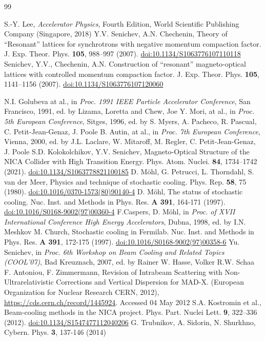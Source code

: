 \documentclass[submitting]{nst}
\begin{document}
	\begin{thebibliography} {99}
		
			S.-Y. Lee, {\it Accelerator Physics}, Fourth Edition, World Scientific Publishing Company (Singapore, 2018)
			Y.V. Senichev, A.N. Chechenin, Theory of “Resonant” lattices for synchrotrons with negative momentum compaction factor. J. Exp. Theor. Phys. {\bf 105}, 988–997 (2007). \href{https://doi.org/10.1134/S1063776107110118}{doi:10.1134/S1063776107110118}
			Senichev, Y.V., Chechenin, A.N. Construction of “resonant” magneto-optical lattices with controlled momentum compaction factor. J. Exp. Theor. Phys. {\bf 105}, 1141–1156 (2007). \href{https://doi.org/10.1134/S1063776107120060}{doi:10.1134/S1063776107120060}
		
		 N.I. Golubeva at al., in {\it Proc. 1991 IEEE Particle Accelerator Conference}, San Francisco, 1991, ed. by Lizama, Loretta and Chew, Joe
			Y. Mori, at al., in {\it Proc. 5th European Conference}, Sitges, 1996, ed. by S. Myers, A. Pacheco, R. Pascual, C. Petit-Jean-Genaz, J. Poole
		 B. Autin, at al., in {\it Proc. 7th European Conference},  Vienna, 2000, ed. by J.L. Laclare, W. Mitaroff, M. Regler, C. Petit-Jean-Genaz, J. Poole
			S.D. Kolokolchikov, Y.V. Senichev, Magneto-Optical Structure of the NICA Collider with High Transition Energy. Phys. Atom. Nuclei. {\bf 84}, 1734–1742 (2021). \href{https://doi.org/10.1134/S1063778821100185}{doi:10.1134/S1063778821100185}
			D. Möhl, G. Petrucci, L. Thorndahl, S. van der Meer, Physics and technique of stochastic cooling. Phys. Rep. {\bf 58}, 75 (1980). \href{https://doi.org/10.1016/0370-1573(80)90140-4}{doi:10.1016/0370-1573(80)90140-4}
			D. Möhl, The status of stochastic cooling. Nuc. Inst. and Methods in Phys. Res. {\bf A 391}, 164-171 (1997). \href{https://doi.org/10.1016/S0168-9002(97)00360-4}{doi:10.1016/S0168-9002(97)00360-4}
			F.Caspers, D. Möhl, in {\it Proc. of XVII International Conference High Energy Accelerators}, Dubna, 1998, ed. by I.N. Meshkov
			M. Church, Stochastic cooling in Fermilab. Nuc. Inst. and Methods in Phys. Res. {\bf A 391}, 172-175 (1997). \href{https://doi.org/10.1016/S0168-9002(97)00358-6}{doi:10.1016/S0168-9002(97)00358-6}
			Yu. Senichev, in {\it Proc. 6th Workshop on Beam Cooling and Related Topics (COOL'07)}, Bad Kreuznach, 2007, ed. by Rainer W. Hasse, Volker R.W. Schaa
			F. Antoniou, F. Zimmermann, Revision of Intrabeam Scattering with Non-Ultrarelativistic Corrections and Vertical Dispersion for MAD-X. (European Organization for Nuclear Research CERN, 2012), \href{https://cds.cern.ch/record/1445924}{https://cds.cern.ch/record/1445924}. Accessed 04 May 2012
			S.A. Kostromin et al., Beam-cooling methods in the NICA project. Phys. Part. Nuclei Lett. {\bf 9}, 322–336 (2012). \href{https://doi.org/10.1134/S1547477112040206}{doi:10.1134/S1547477112040206}
			G. Trubnikov, A. Sidorin, N. Shurkhno, Cybern. Phys. {\bf 3}, 137-146 (2014)
		

\end{thebibliography}
\end{document}
